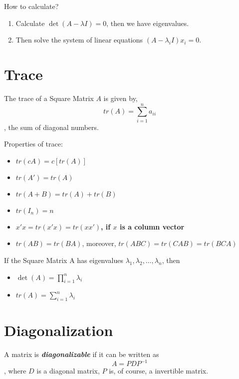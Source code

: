 How to calculate?
\begin{enumerate}
    \item Calculate $\det (A-\lambda I) = 0$, then we have eigenvalues.
    \item Then solve the system of linear equations $(A-\lambda_i I)x_i = 0$.
\end{enumerate}

\section{Trace}

\begin{definition}
    The trace of a Square Matrix $A$ is given by,
    \begin{equation*}
        tr(A) = \sum_{i=1}^{n} a_{ii}
    \end{equation*}, the sum of diagonal numbers.
\end{definition}

Properties of trace:
\begin{itemize}
    \item $tr(cA) = c[tr(A)]$
    \item $tr(A') = tr(A)$
    \item $tr(A+B) = tr(A) + tr(B)$
    \item $tr(I_{n}) = n$
    \item \textbf{$x'x=tr(x'x)=tr(xx')$, if $x$ is a column vector}
    \item $tr(AB) = tr(BA)$, moreover, $tr(ABC) = tr(CAB) = tr(BCA)$
\end{itemize}

If the Square Matrix A has eigenvalues $\lambda_1, \lambda_2, \dots, \lambda_n$, then
\begin{itemize}
    \item $\det(A) = \prod_{i=1}^{n} \lambda_i$
    \item $tr(A) = \sum_{i=1}^{n} \lambda_i$
\end{itemize}

\section{Diagonalization}

\begin{definition}
    A matrix is \textbf{\textit{diagonalizable}} if it can be written as \begin{equation*}
        A = PDP ^{-1}
    \end{equation*}, where $D$ is a diagonal matrix, $P$ is, of course, a invertible matrix.
\end{definition}

